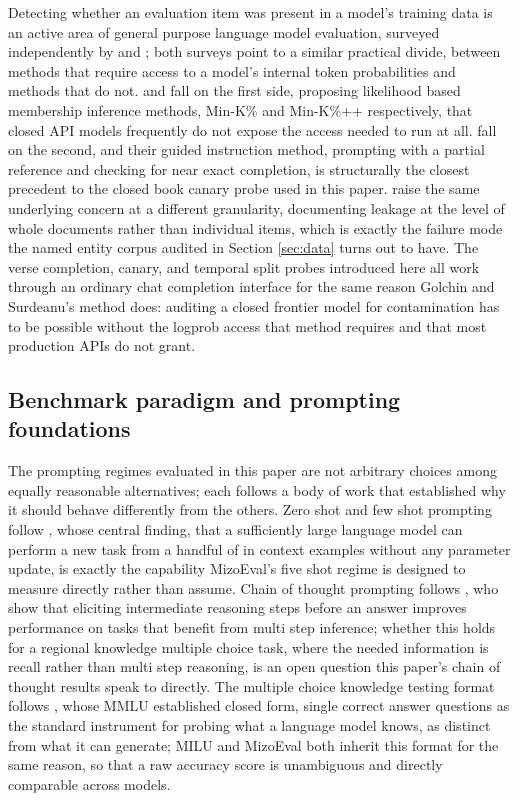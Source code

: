 \documentclass[11pt,a4paper]{article}
\begin{document}
Detecting whether an evaluation item was present in a model's training data is an active area of general purpose language model evaluation, surveyed independently by \citet{xu2024contaminationsurvey} and \citet{cheng2025contaminationsurvey}; both surveys point to a similar practical divide, between methods that require access to a model's internal token probabilities and methods that do not. \citet{shi2023detecting} and \citet{zhang2024minkpp} fall on the first side, proposing likelihood based membership inference methods, Min-K\% and Min-K\%++ respectively, that closed API models frequently do not expose the access needed to run at all. \citet{golchin2024timetravel} fall on the second, and their guided instruction method, prompting with a partial reference and checking for near exact completion, is structurally the closest precedent to the closed book canary probe used in this paper. \citet{elangovan2021memorization} raise the same underlying concern at a different granularity, documenting leakage at the level of whole documents rather than individual items, which is exactly the failure mode the named entity corpus audited in Section \ref{sec:data} turns out to have. The verse completion, canary, and temporal split probes introduced here all work through an ordinary chat completion interface for the same reason Golchin and Surdeanu's method does: auditing a closed frontier model for contamination has to be possible without the logprob access that method requires and that most production APIs do not grant.

\subsection{Benchmark paradigm and prompting foundations}

The prompting regimes evaluated in this paper are not arbitrary choices among equally reasonable alternatives; each follows a body of work that established why it should behave differently from the others. Zero shot and few shot prompting follow \citet{brown2020fewshot}, whose central finding, that a sufficiently large language model can perform a new task from a handful of in context examples without any parameter update, is exactly the capability MizoEval's five shot regime is designed to measure directly rather than assume. Chain of thought prompting follows \citet{wei2022chainofthought}, who show that eliciting intermediate reasoning steps before an answer improves performance on tasks that benefit from multi step inference; whether this holds for a regional knowledge multiple choice task, where the needed information is recall rather than multi step reasoning, is an open question this paper's chain of thought results speak to directly. The multiple choice knowledge testing format follows \citet{hendrycks2021mmlu}, whose MMLU established closed form, single correct answer questions as the standard instrument for probing what a language model knows, as distinct from what it can generate; MILU and MizoEval both inherit this format for the same reason, so that a raw accuracy score is unambiguous and directly comparable across models.
\end{document}
